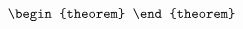 \documentclass[aos,preprint]{imsart}
\begin{document}
\begin{equation}
{\begin{theorem}
	 \end{theorem}

}
\end{equation}
\end{document}
